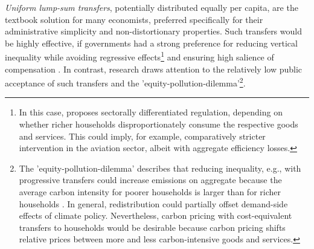 \documentclass[12pt, a4paper]{article}
\begin{document}

\textit{Uniform lump-sum transfers}, potentially distributed equally per capita, are the textbook solution for many economists, preferred specifically for their administrative simplicity and non-distortionary properties. Such transfers would be highly effective, if governments had a strong preference for reducing vertical inequality while avoiding regressive effects\footnote{In this case, \textcite{Stiglitz.2019} proposes sectorally differentiated regulation, depending on whether richer households disproportionately consume the respective goods and services. This could imply, for example, comparatively stricter intervention in the aviation sector, albeit with aggregate efficiency losses.} and ensuring high salience of compensation \autocite{Chetty.2009}. In contrast, research draws attention to the relatively low public acceptance of such transfers and the 'equity-pollution-dilemma'\footnote{The 'equity-pollution-dilemma' describes that reducing inequality, e.g., with progressive transfers could increase emissions on aggregate because the average carbon intensity for poorer households is larger than for richer households \autocite[see also][]{Stiglitz.2019}. In general, redistribution could partially offset demand-side effects of climate policy. Nevertheless, carbon pricing with cost-equivalent transfers to households would be desirable because carbon pricing shifts relative prices between more and less carbon-intensive goods and services.}\autocite{Sager.2019}.
\end{document}
